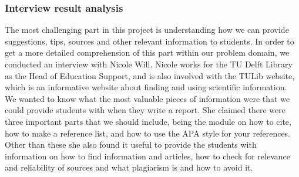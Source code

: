\subsubsection{Interview result analysis} %

The most challenging part in this project is understanding how we can provide suggestions, tips, sources and other relevant information to students. In order to get a more detailed comprehension of this part within our problem domain, we conducted an interview with Nicole Will. Nicole works for the TU Delft Library as the Head of Education Support, and is also involved with the TULib website, which is an informative website about finding and using scientific information.
We wanted to know what the most valuable pieces of information were that we could provide students with when they write a report. She claimed there were three important parts that we should include, being the module on how to cite\cite{tulib:howtocite}, how to make a reference list, and how to use the APA\cite{tulib:apa} style for your references.
Other than these she also found it useful to provide the students with information on how to find information and articles, how to check for relevance and reliability of sources and what plagiarism is and how to avoid it.


